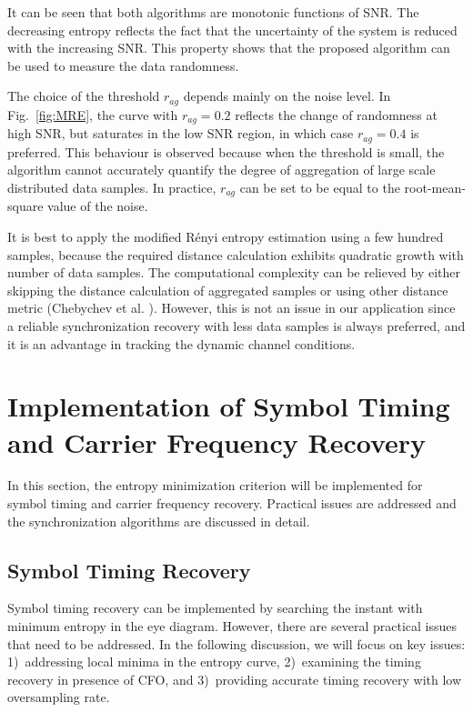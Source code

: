 \documentclass[journal,comsoc, onecolumn, 12pt,draftclsnofoot]{IEEEtran} %
\begin{document}
It can be seen that both algorithms are monotonic functions of SNR.
The decreasing entropy reflects the fact that the uncertainty of the system is reduced with the increasing SNR.
This property shows that the proposed algorithm can be used to measure the data randomness.

The choice of the threshold \(r_{ag}\) depends mainly on the noise level.
In Fig.~\ref{fig:MRE}, the curve with \(r_{ag}=0.2\) reflects the change of randomness at high SNR, but saturates in the low SNR region, in which case \(r_{ag}=0.4\) is preferred.
This behaviour is observed because when the threshold is small, the algorithm cannot accurately quantify the degree of aggregation of large scale distributed data samples.
In practice, $r_{ag}$ can be set to be equal to the root-mean-square value of the noise.

It is best to apply the modified R\'enyi entropy estimation using a few hundred samples,
because the required distance calculation exhibits quadratic growth with number of data samples. 
The computational complexity can be relieved by either skipping the distance calculation of aggregated samples or using other distance metric (Chebychev et al. \cite{Cha2007}).
However, this is not an issue in our application since a reliable synchronization  recovery with less data samples is always preferred, and it is an advantage in tracking the dynamic channel conditions. 
\section{Implementation of Symbol Timing and Carrier Frequency Recovery}
\label{sec:imple}
In this section, the entropy minimization criterion will be implemented for symbol timing and carrier frequency recovery.
Practical issues are addressed and the
synchronization algorithms are discussed in detail. 

\subsection{Symbol Timing Recovery} 
\label{sec:timing}
Symbol timing recovery can be implemented by searching the instant with minimum entropy in the eye diagram.
However, there are several practical issues that need to be addressed.
In the following discussion, we will focus on key issues: 
1)~addressing local minima in the entropy curve,  
2)~examining the timing recovery in presence of CFO, and 
3)~providing accurate timing recovery with low oversampling rate.
\end{document}
